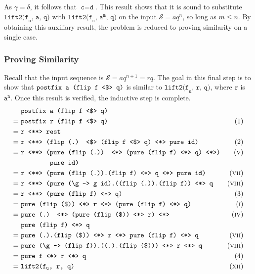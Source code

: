 As $\gamma = \delta$, it follows that $\texttt{c} = \texttt{d}$.
This result shows that it is sound to substitute $\texttt{lift2(f}_\texttt{u}\texttt{, a, q)}$ with $\texttt{lift2(f}_\texttt{u}\texttt{, a}^\texttt{m}\texttt{, q)}$ on the input $\mathcal{S} = aq^n$, so long as $m \leq n$.
By obtaining this auxiliary result, the problem is reduced to proving similarity on a single case.

\subsubsection*{Proving Similarity}
Recall that the input sequence is $\mathcal{S} = aq^{n + 1} = rq$.
The goal in this final step is to show that $\texttt{postfix a (flip f \fmap q)}$ is similar to $\texttt{lift2(f}_\texttt{u}\texttt{, r, q)}$, where $\texttt{r}$ is $\texttt{a}^\texttt{n}$.
Once this result is verified, the inductive step is complete.
\begin{align*}
    & \texttt{postfix a (flip f \fmap q)} \\
    =\ & \texttt{postfix r (flip f \fmap q)} & \text{(1)} \\
    =\ & \texttt{r \pa rest} \\
    =\ & \texttt{r \pa (flip (.) \fmap (flip f \fmap q) \ap pure id)} & \text{(2)} \\
    =\ & \texttt{r \pa (pure (flip (.)) \ap (pure (flip f) \ap q) \ap)} & \equi[5] \\
    & \texttt{{} {} {} {} {} {} {} {} pure id)} \\ %
    =\ & \texttt{r \pa (pure (flip (.)).(flip f) \ap q \ap pure id)} & \equi[7] \\
    =\ & \texttt{r \pa (pure (\textbackslash g -> g id).((flip (.)).(flip f)) \ap q} & \equi[8] \\
    =\ & \texttt{r \pa (pure (flip f) \ap q)} & \text{(3)} \\
    =\ & \texttt{pure (flip (\$)) \ap r \ap (pure (flip f) \ap q)} & \equi[1] \\
    =\ & \texttt{pure (.) \ap (pure (flip (\$)) \ap r) \ap} & \equi[4] \\
    & \texttt{pure (flip f) \ap q} \\
    =\ & \texttt{pure (.).(flip (\$)) \ap r \ap pure (flip f) \ap q} & \equi[7] \\
    =\ & \texttt{pure (\textbackslash g -> (flip f)).((.).(flip (\$))) \ap r \ap q} & \equi[8] \\
    =\ & \texttt{pure f \ap r \ap q} & \text{(4)} \\
    =\ & \texttt{lift2(f}_\texttt{u}\texttt{, r, q)} & \equi[12]
\end{align*}
